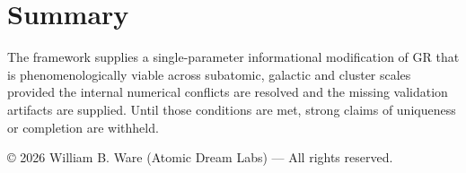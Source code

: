 \documentclass[11pt]{article}
\begin{document}
\section{Summary}
The framework supplies a single-parameter informational modification of GR that is phenomenologically viable across subatomic, galactic and cluster scales provided the internal numerical conflicts are resolved and the missing validation artifacts are supplied. Until those conditions are met, strong claims of uniqueness or completion are withheld.

© 2026 William B. Ware (Atomic Dream Labs) — All rights reserved.
\end{document}
